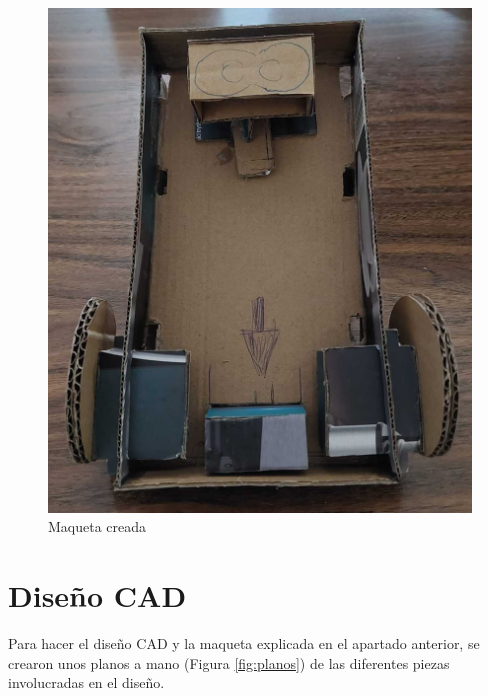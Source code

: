 \begin{figure}[ht!]
\begin{minipage}{0.4\linewidth}
		\includegraphics[width=\linewidth]{figs/cap5/boceto_carton7.jpeg}
	\end{minipage}
	\caption{Maqueta creada}
	\label{fig:maqueta2}
\end{figure}


\section{Diseño CAD}
\label{sec:diseñocad}

Para hacer el diseño CAD y la maqueta explicada en el apartado anterior, se crearon unos planos a mano (Figura \ref{fig:planos}) de las diferentes piezas involucradas en el diseño. 


